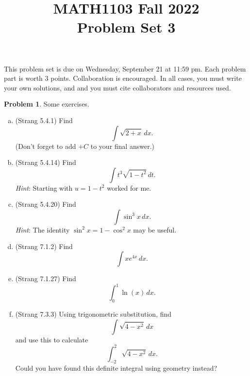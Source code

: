 \documentclass[11pt,oneside]{amsart}
\title{MATH1103 Fall 2022\\
Problem Set 3}
\theoremstyle{definition}
\newtheorem{problem}{Problem}
\begin{document}
    \maketitle
    This problem set is due on Wednesday, September 21 at 11:59 pm. Each problem part is worth 3 points. Collaboration is encouraged. In all cases, you must write your own solutions, and and you must cite collaborators and resources used.

    \begin{problem}
        Some exercises.
        \begin{enumerate}[(a)]
            \item (Strang 5.4.1) Find
            \[\int\sqrt{2+x}\,dx.\]
            (Don't forget to add $+C$ to your final answer.)
            \item (Strang 5.4.14) Find
            \[\int t^3\sqrt{1-t^2}\,dt.\]
            \emph{Hint}: Starting with $u=1-t^2$ worked for me.
            \item (Strang 5.4.20) Find
            \[\int\sin^3 x\,dx.\]
            \emph{Hint}: The identity $\sin^2 x=1-\cos^2x $ may be useful.
            \item (Strang 7.1.2) Find
            \[\int xe^{4x}\,dx.\]
            \item (Strang 7.1.27) Find
            \[\int_0^1\ln(x)\,dx.\]
            \item (Strang 7.3.3) Using trigonometric substitution, find
            \[\int\sqrt{4-x^2}\,dx\]
            and use this to calculate
            \[\int_{-2}^2\sqrt{4-x^2}\,dx.\]
            Could you have found this definite integral using geometry instead?
        \end{enumerate}
    \end{problem}
\end{document}
